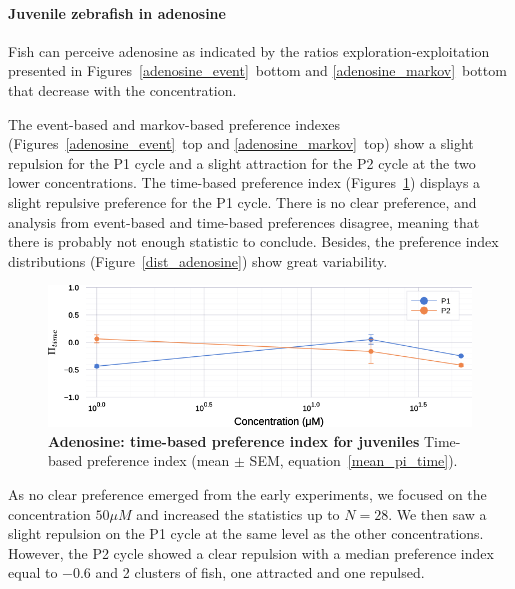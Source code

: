   \paragraph{Juvenile zebrafish in adenosine} Fish can perceive adenosine as indicated by the ratios exploration-exploitation presented in Figures~\ref{adenosine_event}~bottom and \ref{adenosine_markov}~bottom that decrease with the concentration.

  The event-based and markov-based preference indexes (Figures~\ref{adenosine_event}~top and \ref{adenosine_markov}~top) show a slight repulsion for the P1 cycle and a slight attraction for the P2 cycle at the two lower concentrations.  The time-based preference index (Figures~\ref{adenosine}) displays a slight repulsive preference for the P1 cycle. There is no clear preference, and analysis from event-based and time-based preferences disagree, meaning that there is probably not enough statistic to conclude. Besides, the preference index distributions (Figure~\ref{dist_adenosine}) show great variability.

    \begin{figure}[h!]
      \centering
      \includegraphics[width=1\textwidth]{part_2/assets/adenosine.png}
      \caption{\textbf{Adenosine: time-based preference index for juveniles} Time-based preference index (mean $\pm$ SEM, equation~\ref{mean_pi_time}).}
      \label{adenosine}
    \end{figure}

  As no clear preference emerged from the early experiments, we focused on the concentration $50 \mu M$ and increased the statistics up to $N=28$. We then saw a slight repulsion on the P1 cycle at the same level as the other concentrations. However, the P2 cycle showed a clear repulsion with a median preference index equal to $-0.6$ and 2 clusters of fish, one attracted and one repulsed.

